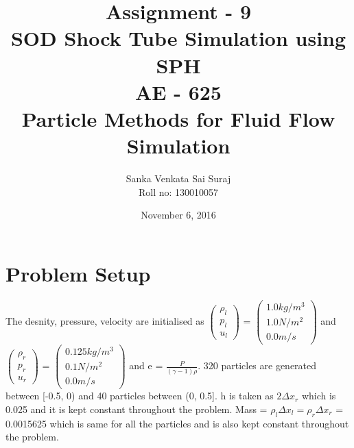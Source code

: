 \documentclass[12pt, a4paper]{report}
\title{\huge Assignment - 9 \\
		\large SOD Shock Tube Simulation using SPH \\[0.5in]
		\large AE - 625 \\
		\large Particle Methods for Fluid Flow Simulation 		
		}
\author{\large Sanka Venkata Sai Suraj \\
		\large Roll no: 130010057
		}
\date{November 6, 2016}
\begin{document}
\maketitle

\section*{Problem Setup}
The desnity, pressure, velocity are initialised as 
$ \begin{pmatrix}
	\rho_l \\
	p_l \\
	u_l
\end{pmatrix} $ = 
$\begin{pmatrix}
	1.0 kg/m^3 \\
	1.0 N/m^2 \\
	0.0 m/s
\end{pmatrix} $ and 
$ \begin{pmatrix}
	\rho_r \\
	p_r \\
	u_r
\end{pmatrix} $ = 
$\begin{pmatrix}
	0.125  kg/m^3 \\
	0.1  N/m^2 \\
	0.0 m/s
\end{pmatrix} $ and e = $\frac{P}{(\gamma-1)\rho}$. 
320 particles are generated between [-0.5, 0) and 40 particles between (0, 0.5]. h is taken as $2\Delta x_r$ which is 0.025 and it is kept constant throughout the problem. Mass = $\rho_l\Delta x_l = \rho_r\Delta x_r$ = 0.0015625 which is same for all the particles and is also kept constant throughout the problem. \\
\end{document}
